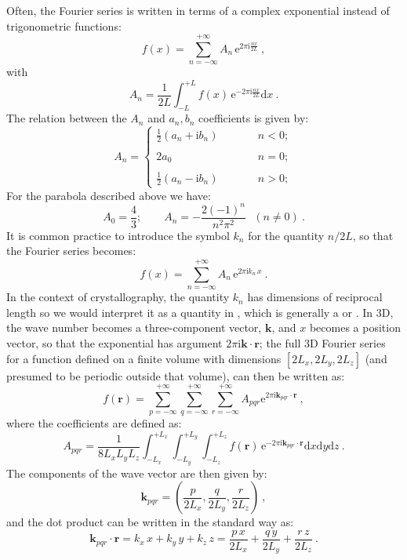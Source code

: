 Often, the Fourier series is written in terms of a complex exponential instead of trigonometric functions:
\begin{equation}
	f(x) = \sum_{n=-\infty}^{+\infty}A_n\,\mathrm{e}^{2\pi\mathrm{i}\frac{nx}{2L}}\ ,\label{\chabbr:eq:complexFS}
\end{equation}
with 
\begin{equation}
	A_n=\frac{1}{2L}\int_{-L}^{+L}f(x)\,\mathrm{e}^{-2\pi\mathrm{i}\frac{nx}{2L}}\mathrm{d}x\ .\label{\chabbr:eq:complexFScoef}
\end{equation}
The relation between the $A_n$ and $a_n, b_n$ coefficients is given by:
\[
	A_n = \left\{\begin{array}{lcr}
	\frac{1}{2}(a_n+\mathrm{i}b_n)&\qquad&n<0;\\
	&&\\
	2a_0&\qquad&n=0;\\
	&&\\
	\frac{1}{2}(a_n-\mathrm{i}b_n)&\qquad&n>0;
	\end{array}\right.	
\]
For the parabola described above we have:
\[
	A_0 = \frac{4}{3};\qquad A_n = -\frac{2(-1)^n}{n^2\pi^2}\text{ $(n\ne 0)$}\ .
\]
It is common practice to introduce the symbol $k_n$ for the quantity $n/2L$, so that the Fourier series becomes:
\[
	f(x) = \sum_{n=-\infty}^{+\infty}A_n\,\mathrm{e}^{2\pi\mathrm{i} k_n\,x}\ .
\]
In the context of crystallography, the quantity $k_n$ has dimensions of reciprocal length so we would interpret it as a quantity in , which is generally a  or .   In 3D, the wave number becomes a three-component vector, $\mathbf{k}$, and $x$ becomes a position vector, so that the exponential has argument $2\pi\mathrm{i}\mathbf{k}\cdot\mathbf{r}$; the full 3D Fourier series for a function defined on a finite volume with dimensions $[2L_x,2L_y,2L_z]$ (and presumed to be periodic outside that volume), can then be written as:
\begin{equation}
	f(\mathbf{r}) =  \sum_{p=-\infty}^{+\infty}\sum_{q=-\infty}^{+\infty}\sum_{r=-\infty}^{+\infty} A_{pqr} \mathrm{e}^{2\pi\mathrm{i}\mathbf{k}_{pqr}\cdot\mathbf{r}}\ ,\label{\chabbr:eq:complexFS3D}
\end{equation}
where the coefficients are defined as:
\begin{equation}
	A_{pqr} = \frac{1}{8L_xL_yL_z}\int_{-L_x}^{+L_x}\int_{-L_y}^{+L_y}\int_{-L_z}^{+L_z}f(\mathbf{r})\,
	\mathrm{e}^{-2\pi\mathrm{i}\mathbf{k}_{pqr}\cdot\mathbf{r}}\mathrm{d}x\mathrm{d}y\mathrm{d}z\ .\label{\chabbr:eq:complexFScoef3D}
\end{equation}
The components of the wave vector are then given by:
\[
	\mathbf{k}_{pqr}=\left(\frac{p}{2L_x},\frac{q}{2L_y},\frac{r}{2L_z}\right)\ ,
\]
and the dot product can be written in the standard way as:
\[
	\mathbf{k}_{pqr}\cdot\mathbf{r} = k_x\,x+k_y\,y+k_z\,z = \frac{p\,x}{2L_x}+\frac{q\, y}{2L_y}+\frac{r\,z}{2L_z}\ .
\]

